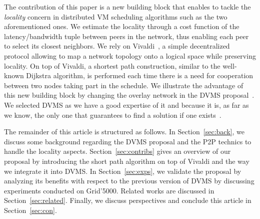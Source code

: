 The contribution of this paper is a new building block that enables to tackle the
\emph{locality} concern in distributed VM scheduling algorithms such as the two
aforementioned ones.
We estimate the locality through a cost function of the latency/bandwidth tuple between
peers in the network, thus enabling each peer to select its closest neighbors. We rely on
Vivaldi~\cite{dabek:2001:sigcomm04}, a simple decentralized protocol allowing to map a
network topology onto a logical space while preserving locality. On top of Vivaldi, a shortest path
construction, similar to the well-known Dijkstra algorithm, is performed each time there is
a need for cooperation between two nodes taking part in the schedule. We illustrate the
advantage of this new building block by changing the overlay network in the DVMS
proposal~\cite{quesnel:cpe2012}. We selected DVMS as we have a good expertise of it and
because it is, as far as we know, the only one that guarantees to find a solution if one exists~\cite{quesnel:ispa2013}.
                                                   
The remainder of this article is structured as follows. In Section~\ref{sec:back}, we
discuss some background regarding the DVMS proposal and the P2P technics to handle
the locality aspects. Section~\ref{sec:contribs} gives an overview of our proposal by
introducing the short path algorithm on top of Vivaldi and the way we integrate it into
DVMS. In Section~\ref{sec:exps}, we validate the proposal by analyzing its benefits with
respect to the previous version of DVMS by discussing experiments conducted on
Grid'5000. Related works are discussed in Section~\ref{sec:related}. Finally, we discuss
perspectives and conclude this article in Section~\ref{sec:con}.

